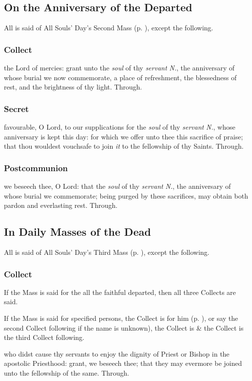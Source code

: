 \subsection{On the Anniversary of the Departed}
\begin{rubric}
    All is said of All Souls' Day's Second Mass (p. \pageref{AllSoulsII}), except the following.
\end{rubric}
\subsubsection{Collect}
 the Lord of mercies: grant unto the \textit{soul} of thy \textit{servant} \textit{N.}, the anniversary of whose burial we now commemorate, a place of refreshment, the blessedness of rest, and the brightness of thy light. Through.

\subsubsection{Secret}
 favourable, O Lord, to our supplications for the \textit{soul} of thy \textit{servant} \textit{N.}, whose anniversary is kept this day: for which we offer unto thee this sacrifice of praise; that thou wouldest vouchsafe to join \textit{it} to the fellowship of thy Saints. Through.

\subsubsection{Postcommunion}
 we beseech thee, O Lord: that the \textit{soul} of thy \textit{servant} \textit{N.}, the anniversary of whose burial we commemorate; being purged by these sacrifices, may obtain both pardon and everlasting rest. Through.

\subsection{In Daily Masses of the Dead}
\begin{rubric}
    All is said of All Souls' Day's Third Mass (p. \pageref{AllSoulsIII}), except the following.
\end{rubric}
\vspace{-0.5\baselineskip}
\subsubsection{Collect}
\begin{rubric}
    If the Mass is said for the all the faithful departed, then all three Collects are said.
\end{rubric}
\begin{rubric}
    If the Mass is said for specified persons, the  Collect is for him (p. \pageref{RequiemPrayers}), or say the second Collect following if the name is unknown), the  Collect is  \& the  Collect is the third Collect following.
\end{rubric}
 who didst cause thy servants to enjoy the dignity of Priest or Bishop in the apostolic Priesthood: grant, we beseech thee; that they may evermore be joined unto the fellowship of the same. Through.

